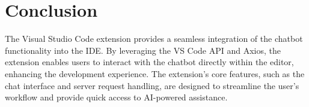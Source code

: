 \section{Conclusion}

The Visual Studio Code extension provides a seamless integration of the chatbot functionality into the IDE. By leveraging the VS Code API and Axios, the extension enables users to interact with the chatbot directly within the editor, enhancing the development experience. The extension's core features, such as the chat interface and server request handling, are designed to streamline the user's workflow and provide quick access to AI-powered assistance.